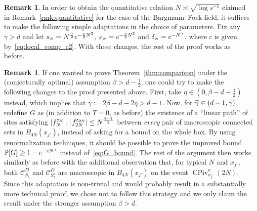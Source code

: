\documentclass[10pt]{amsart}
\theoremstyle{definition}\newtheorem{defi}[theo]{Definition}\newtheorem{rema}[theo]{Remark}\newtheorem{exam}[theo]{Example}\newtheorem{exem}[theo]{Example}\newtheorem{nota}[theo]{Notation}
\DeclareMathOperator{\CPiv}{CPiv}
\renewcommand{\P}{\mathbb{P}}
\newcommand{\clC}{\mathcal{C}}
\newcommand{\sfc}{\mathsf{c}}
\newcommand{\si}[1]{{\mathchoice{}{}{\scriptscriptstyle}{}#1}}
\let\oldtilde\tilde
\renewcommand*{\tilde}[1]{\mathchoice{\widetilde{#1}}{\widetilde{#1}}{\oldtilde{#1}}{\oldtilde{#1}}}
\begin{document}
\begin{rema}\label{rmk:B-F_adapt}
In order to obtain the quantitative relation $N\asymp\sqrt{\log s^{-1}}$ claimed in Remark~\ref{rmk:quantitative} for the case of the Bargmann--Fock field, it suffices to make the following simple adaptations in the choice of parameters. Fix any $\gamma>d$ and let $s_{\si{N}}=N^{\frac{\gamma}{2}}e^{-\frac{c}{2} N^2}$, $\varepsilon_{\si{N}}=e^{-\frac{c}{2} N^2}$ and $\delta_{\si{N}}=e^{-N^{\gamma}}$, where $c$ is given by~\eqref{eq:local_comp_r2}. With these changes, the rest of the proof works as before.
\end{rema}

\begin{rema}\label{rmk:beta>d-1/2}
If one wanted to prove Theorem~\ref{thm:comparison} under the (conjecturally optimal) assumption $\beta>d-\frac12$, one could try to make the following changes to the proof presented above. First, take $\eta\in(0,\beta-d+\frac12)$ instead, which implies that $\gamma:=2\beta-d-2\eta>d-1$. Now, for $\tilde{\gamma}\in (d-1,\gamma)$, redefine $G$ as (in addition to $T=0$, as before) the existence of a ``linear path'' of sites satisfying $|f^{\varepsilon_N}_N|,\, |f^{\varepsilon_{2N}}_{2N}| \leq N^{\frac{\tilde{\gamma}-1}{2}}$ between \emph{every} pair of macroscopic connected sets in $B_{4N}(x_{j'})$, instead of asking for a bound on the whole box. By using renormalization techniques, it should be possible to prove the improved bound $\P[G]\geq 1-e^{-cN^{\tilde{\gamma}}}$ instead of~\eqref{eq:G_bound}. The rest of the argument then works similarly as before with the additional observation that, for typical $N$ and $x_{j'}$, both $\clC_{S_1}^D$ and $\clC_{S_2^{\sfc}}^D$ are macroscopic in $B_{4N}(x_{j'})$ on the event $\CPiv^n_{x_{j'}}(2N)$. Since this adaptation is non-trivial and would probably result in a substantially more technical proof, we chose not to follow this strategy and we only claim the result under the stronger assumption $\beta>d$.
\end{rema}
\end{document}
